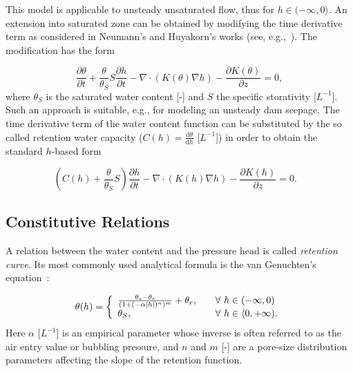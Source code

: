 \documentclass[final,3p,times,twocolumn]{elsarticle}
\begin{document}
This model is applicable to unsteady unsaturated flow, thus for $h \in (-\infty , 0 \rangle$. 
An extension into saturated zone can be obtained by modifying the time derivative term 
as considered in Neumann's and Huyakorn's works (see, e.g.,~\cite{neuman1,neuman2,neuman3,huyakorn1,huyakorn2}). The modification has the form 

\begin{equation}
\label{neuman-mod}
\frac{\partial \theta}{\partial t} + \frac{\theta}{\theta_S} S \frac{\partial h}{\partial t}
- \nabla \cdot \left( K(\theta) \nabla h \right) - \frac{\partial K(\theta)}{\partial z} = 0,
\end{equation}
where $\theta_S$ is the saturated water content [-] and $S$ the specific storativity 
[$L^{-1}$]. Such an approach is suitable, e.g., for modeling an unsteady dam seepage.
The time derivative term of the water content function can be substituted by 
the so called retention water capacity ($C(h) = \frac{\textrm{d}\theta}{\textrm{d} h}$ [$L^{-1}$])
in order to obtain the standard $h$-based form

\begin{equation}\label{rich-final}
\left(C(h)
+ \frac{\theta}{\theta_S} S \right) \frac{\partial h}{\partial t}
- \nabla \cdot \left( K(h) \nabla h \right) - \frac{\partial K(h)}{\partial z} = 0.\ \ \ \ 
\end{equation}

\subsection{Constitutive Relations}

A relation between the water content and the pressure head is called 
{\em retention curve}. Its most commonly used analytical formula is 
the van Genuchten's equation~\cite{vangenuchten}:

\begin{equation}
\label{vangenuchten-eq}
\theta (h) = \left\{ 
\begin{array}{l l}
 \frac{\theta_s -\theta_r}{(1+(-\alpha |h|)^n)^m} + \theta_r,  & \quad \mbox{$\forall$ $h \in (-\infty, 0 )$}\\
  \theta_S, & \quad \mbox{$\forall$ $h \in \langle 0, + \infty )$}.\\
\end{array} \right.
\end{equation}
Here $\alpha$ [$L^{-1}$] is an empirical parameter  whose inverse is often 
referred to as the air entry value or bubbling pressure, and $n$ and $m$ [-]  
are a pore-size distribution parameters affecting the slope of the retention 
function.
\end{document}
